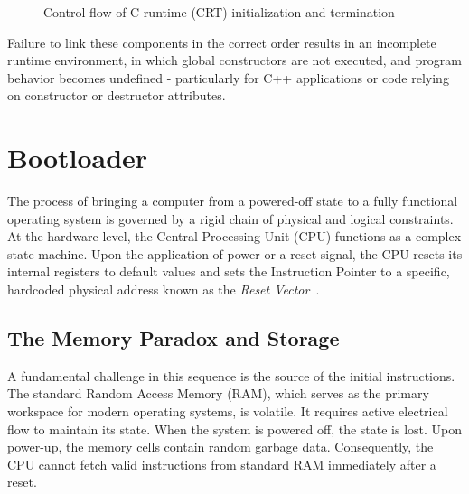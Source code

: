 \documentclass[a4paper,10pt,twoside]{report}
\theoremstyle{definition}
\begin{document}
\begin{figure}[htbp]
    \caption{Control flow of C runtime (CRT) initialization and termination}
    \label{fig:crt-init-flow}
\end{figure}

Failure to link these components in the correct order results in an incomplete runtime environment, in which global constructors are not executed, and program behavior becomes undefined - particularly for C++ applications or code relying on constructor or destructor attributes.

\section{Bootloader}
\label{subsec:theory_bootloader}

The process of bringing a computer from a powered-off state to a fully functional operating system is governed by a rigid chain of physical and logical constraints. At the hardware level, the Central Processing Unit (CPU) functions as a complex state machine. Upon the application of power or a reset signal, the CPU resets its internal registers to default values and sets the Instruction Pointer to a specific, hardcoded physical address known as the \textit{Reset Vector}~\cite{IntelManual-Reset}.

\subsection{The Memory Paradox and Storage}
A fundamental challenge in this sequence is the source of the initial instructions. The standard Random Access Memory (RAM), which serves as the primary workspace for modern operating systems, is volatile. It requires active electrical flow to maintain its state. When the system is powered off, the state is lost. Upon power-up, the memory cells contain random garbage data. Consequently, the CPU cannot fetch valid instructions from standard RAM immediately after a reset.
\end{document}
